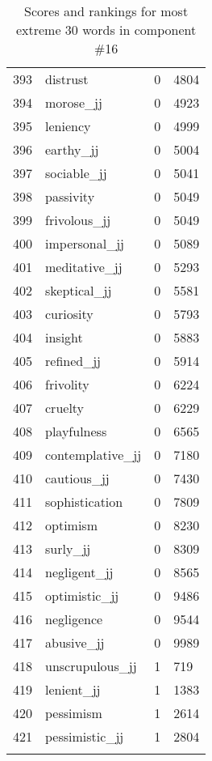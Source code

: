 \begin{longtable}[!htbp]{| rlr@{.}l |}
    393 & distrust & 0 & 4804 \\
    394 & morose\_jj & 0 & 4923 \\
    395 & leniency & 0 & 4999 \\
    396 & earthy\_jj & 0 & 5004 \\
    397 & sociable\_jj & 0 & 5041 \\
    398 & passivity & 0 & 5049 \\
    399 & frivolous\_jj & 0 & 5049 \\
    400 & impersonal\_jj & 0 & 5089 \\
    401 & meditative\_jj & 0 & 5293 \\
    402 & skeptical\_jj & 0 & 5581 \\
    403 & curiosity & 0 & 5793 \\
    404 & insight & 0 & 5883 \\
    405 & refined\_jj & 0 & 5914 \\
    406 & frivolity & 0 & 6224 \\
    407 & cruelty & 0 & 6229 \\
    408 & playfulness & 0 & 6565 \\
    409 & contemplative\_jj & 0 & 7180 \\
    410 & cautious\_jj & 0 & 7430 \\
    411 & sophistication & 0 & 7809 \\
    412 & optimism & 0 & 8230 \\
    413 & surly\_jj & 0 & 8309 \\
    414 & negligent\_jj & 0 & 8565 \\
    415 & optimistic\_jj & 0 & 9486 \\
    416 & negligence & 0 & 9544 \\
    417 & abusive\_jj & 0 & 9989 \\
    418 & unscrupulous\_jj & 1 & 719 \\
    419 & lenient\_jj & 1 & 1383 \\
    420 & pessimism & 1 & 2614 \\
    421 & pessimistic\_jj & 1 & 2804 \\
    \hline
    \caption{Scores and rankings for most extreme 30 words in component \#16} \\
\end{longtable}
